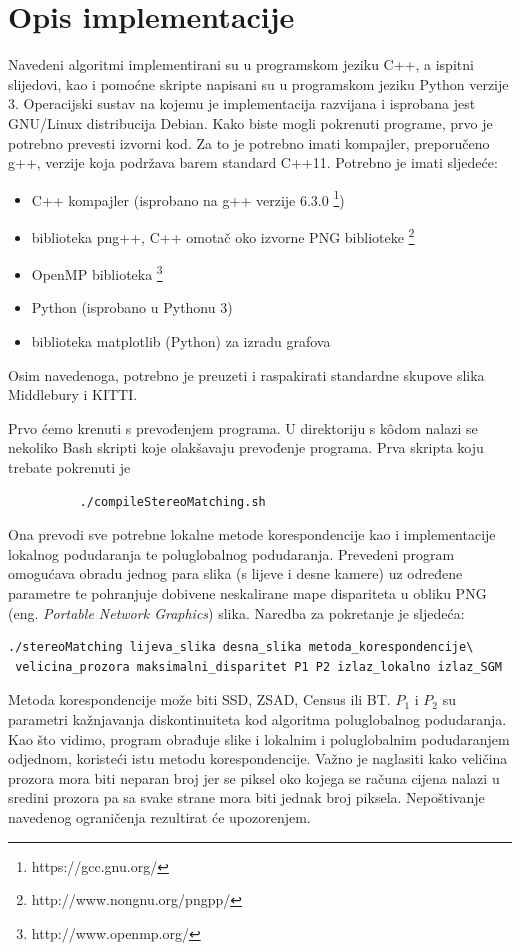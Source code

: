\documentclass[utf8, zavrsni, numeric]{fer}
\begin{document}
\chapter{Opis implementacije}

Navedeni algoritmi implementirani su u programskom jeziku C++, a ispitni slijedovi, kao i pomoćne skripte napisani su u programskom jeziku Python verzije 3.
Operacijski sustav na kojemu je implementacija razvijana i isprobana jest GNU/Linux distribucija Debian.
Kako biste mogli pokrenuti programe, prvo je potrebno prevesti izvorni kod. Za to je potrebno imati kompajler, preporučeno g++, verzije koja podržava barem standard C++11.
Potrebno je imati sljedeće:
\begin{itemize}
\item C++ kompajler (isprobano na g++ verzije 6.3.0 \footnote{https://gcc.gnu.org/})
\item biblioteka png++, C++ omotač oko izvorne PNG biblioteke \footnote{http://www.nongnu.org/pngpp/}
\item OpenMP biblioteka \footnote{http://www.openmp.org/}
\item Python (isprobano u Pythonu 3)
\item biblioteka matplotlib (Python) za izradu grafova
\end{itemize}

Osim navedenoga, potrebno je preuzeti i raspakirati standardne skupove slika Middlebury i
KITTI.

Prvo ćemo krenuti s prevođenjem programa. U direktoriju s k\^odom nalazi se nekoliko Bash skripti koje olakšavaju prevođenje programa. Prva skripta koju trebate pokrenuti je
\begin{verbatim}
          ./compileStereoMatching.sh
\end{verbatim}
Ona prevodi sve potrebne lokalne metode korespondencije kao i implementacije lokalnog podudaranja te poluglobalnog podudaranja. Prevedeni program omogućava obradu jednog para slika (s lijeve i desne kamere) uz određene parametre te pohranjuje dobivene neskalirane mape dispariteta
u obliku PNG (eng. {\sl Portable Network Graphics}) slika. Naredba za pokretanje je sljedeća:
\begin{verbatim}
./stereoMatching lijeva_slika desna_slika metoda_korespondencije\
 velicina_prozora maksimalni_disparitet P1 P2 izlaz_lokalno izlaz_SGM
\end{verbatim}
Metoda korespondencije može biti SSD, ZSAD, Census ili BT. $P_1$ i $P_2$ su parametri kažnjavanja
diskontinuiteta kod algoritma poluglobalnog podudaranja. Kao što vidimo, program obrađuje slike
i lokalnim i poluglobalnim podudaranjem odjednom, koristeći istu metodu korespondencije.
Važno je naglasiti kako veličina prozora mora biti neparan broj jer se piksel oko kojega se računa cijena nalazi u sredini prozora pa sa svake strane mora biti jednak broj piksela.
Nepoštivanje navedenog ograničenja rezultirat će upozorenjem.
\end{document}
